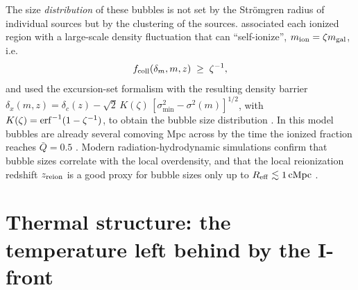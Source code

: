 \documentclass[11pt,a4paper]{article}
\newcommand{\cMpc}{\,{\rm cMpc}}
\begin{document}
The size \emph{distribution} of these bubbles is not set by the Str\"omgren radius of individual
sources but by the clustering of the sources. \citet{Furlanetto2004} associated each ionized region
with a large-scale density fluctuation that can ``self-ionize'', $m_{\rm ion}=\zeta m_{\rm gal}$,
i.e.
\begin{equation}
  f_{\rm coll}(\delta_m,m,z)\;\ge\;\zeta^{-1},
  \label{eq:barrier}
\end{equation}
and used the excursion-set formalism with the resulting density barrier
$\delta_x(m,z)=\delta_c(z)-\sqrt{2}\,K(\zeta)\,[\sigma^2_{\min}-\sigma^2(m)]^{1/2}$, with
$K(\zeta)={\rm erf}^{-1}(1-\zeta^{-1})$, to obtain the bubble size distribution
\citep{Furlanetto2004}. In this model bubbles are already several comoving Mpc across by the time the
ionized fraction reaches $\bar Q=0.5$ \citep{Furlanetto2004}. Modern radiation-hydrodynamic
simulations confirm that bubble sizes correlate with the local overdensity, and that the local
reionization redshift $z_{\rm reion}$ is a good proxy for bubble sizes only up to
$R_{\rm eff}\lesssim1\cMpc$ \citep{Neyer2023}.

\section{Thermal structure: the temperature left behind by the I-front}
\label{sec:thermal}
\end{document}
